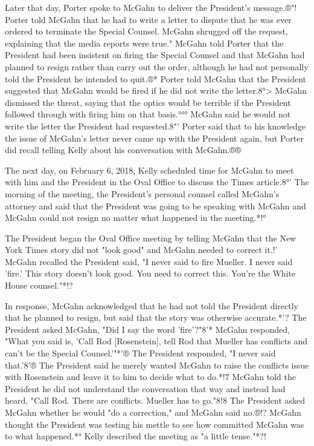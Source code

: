 Later that day, Porter spoke to McGahn to deliver the President's message.®"!
Porter told McGahn that he had to write a letter to dispute that he was ever ordered to terminate the Special Counsel.
McGahn shrugged off the request, explaining that the media reports were true."
McGahn told Porter that the President had been insistent on firing the Special Counsel and that McGahn had planned to resign rather than carry out the order, although he had not personally told the President he intended to quit.®*
Porter told McGahn that the President suggested that McGahn would be fired if he did not write the letter.8°>
McGahn dismissed the threat, saying that the optics would be terrible if the President followed through with firing him on that basis.°°°
McGahn said he would not write the letter the President had requested.8"'
Porter said that to his knowledge the issue of McGahn's letter never came up with the President again, but Porter did recall telling Kelly about his conversation with McGahn.®®

The next day, on February 6, 2018, Kelly scheduled time for McGahn to meet with him and the President in the Oval Office to discuss the Times article.8°'
The morning of the meeting, the President's personal counsel called McGahn's attorney and said that the President was going to be speaking with McGahn and McGahn could not resign no matter what happened in the meeting.*!°

The President began the Oval Office meeting by telling McGahn that the New York Times story did not "look good" and McGahn needed to correct it.!'
McGahn recalled the President said, "I never said to fire Mueller.
I never said 'fire.'
This story doesn't look good.
You need to correct this.
You're the White House counsel."*!?

In response, McGahn acknowledged that he had not told the President directly that he planned to resign, but said that the story was otherwise accurate.*'?
The President asked McGahn, "Did I say the word 'fire'?"8'*
McGahn responded, "What you said is, 'Call Rod [Rosenstein], tell Rod that Mueller has conflicts and can't be the Special Counsel.'"*'®
The President responded, "I never said that.'8'®
The President said he merely wanted McGahn to raise the conflicts issue with Rosenstein and leave it to him to decide what to do.*!7
McGahn told the President he did not understand the conversation that way and instead had heard, "Call Rod.
There are conflicts.
Mueller has to go."8!8
The President asked McGahn whether he would "do a correction," and McGahn said no.®!?
McGahn thought the President was testing his mettle to see how committed McGahn was to what happened.*°
Kelly described the meeting as "a little tense."*?!

